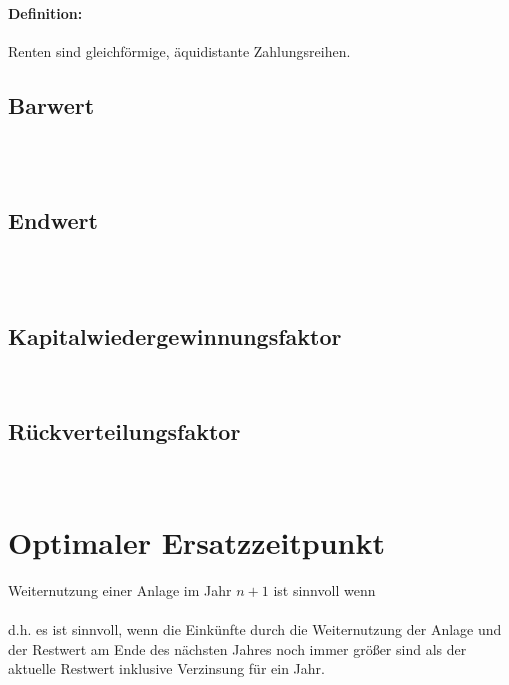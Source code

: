 \paragraph{Definition:} Renten sind gleichförmige,
äquidistante Zahlungsreihen.

\clearpage
\subsection{Barwert}
\\
\\

\clearpage
\subsection{Endwert}
\\
\\


\clearpage
\subsection{Kapitalwiedergewinnungsfaktor}
\\

\clearpage
\subsection{Rückverteilungsfaktor}
\\

\clearpage
\section{Optimaler Ersatzzeitpunkt}
Weiternutzung einer Anlage im Jahr $n+1$ ist sinnvoll wenn\\
\\
d.h. es ist sinnvoll, wenn die Einkünfte durch die Weiternutzung der Anlage und der Restwert am Ende des nächsten Jahres noch immer größer sind als der aktuelle Restwert inklusive Verzinsung für ein Jahr.

